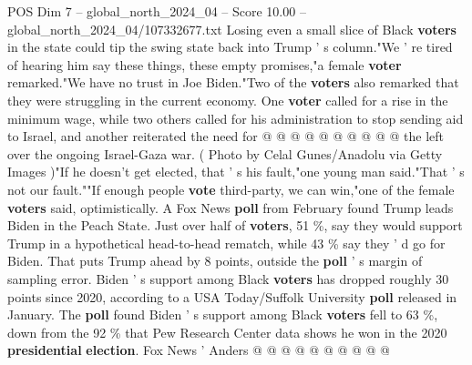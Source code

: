\begin{textsample}{POS Dim 7 – global\_north\_2024\_04 – Score 10.00 – global\_north\_2024\_04/107332677.txt}
Losing even a small slice of Black \textbf{voters} in the state could tip the swing state back into Trump ' s column."We ' re tired of hearing him say these things, these empty promises,"a female \textbf{voter} remarked."We have no trust in Joe Biden."Two of the \textbf{voters} also remarked that they were struggling in the current economy.
One \textbf{voter} called for a rise in the minimum wage, while two others called for his administration to stop sending aid to Israel, and another reiterated the need for @ @ @ @ @ @ @ @ @ @ the left over the ongoing Israel-Gaza war. ( Photo by Celal Gunes/Anadolu via Getty Images )"If he doesn't get elected, that ' s his fault,"one young man said."That ' s not our fault.""If enough people \textbf{vote} third-party, we can win,"one of the female \textbf{voters} said, optimistically.
A Fox News \textbf{poll} from February found Trump leads Biden in the Peach State.
Just over half of \textbf{voters}, 51 \%, say they would support Trump in a hypothetical head-to-head rematch, while 43 \% say they ' d go for Biden.
That puts Trump ahead by 8 points, outside the \textbf{poll} ' s margin of sampling error.
Biden ' s support among Black \textbf{voters} has dropped roughly 30 points since 2020, according to a USA Today/Suffolk University \textbf{poll} released in January.
The \textbf{poll} found Biden ' s support among Black \textbf{voters} fell to 63 \%, down from the 92 \% that Pew Research Center data shows he won in the 2020 \textbf{presidential} \textbf{election}.
Fox News ' Anders @ @ @ @ @ @ @ @ @ @

\end{textsample}
